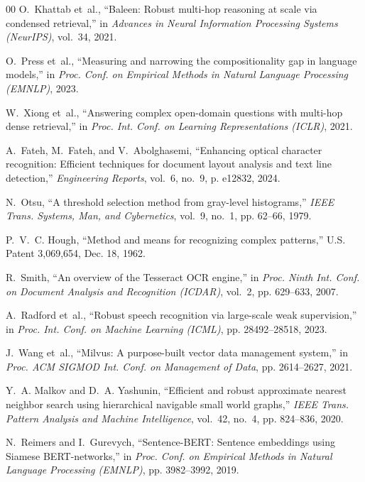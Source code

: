 \documentclass[conference]{IEEEtran}
\begin{document}
\begin{thebibliography}{00}
O.~Khattab et~al., ``Baleen: Robust multi-hop reasoning at scale via condensed retrieval,'' in \emph{Advances in Neural Information Processing Systems (NeurIPS)}, vol.~34, 2021.

O.~Press et~al., ``Measuring and narrowing the compositionality gap in language models,'' in \emph{Proc. Conf. on Empirical Methods in Natural Language Processing (EMNLP)}, 2023.

W.~Xiong et~al., ``Answering complex open-domain questions with multi-hop dense retrieval,'' in \emph{Proc. Int. Conf. on Learning Representations (ICLR)}, 2021.

A.~Fateh, M.~Fateh, and V.~Abolghasemi, ``Enhancing optical character recognition: Efficient techniques for document layout analysis and text line detection,'' \emph{Engineering Reports}, vol.~6, no.~9, p. e12832, 2024.

N.~Otsu, ``A threshold selection method from gray-level histograms,'' \emph{IEEE Trans. Systems, Man, and Cybernetics}, vol.~9, no.~1, pp. 62--66, 1979.

P.~V.~C. Hough, ``Method and means for recognizing complex patterns,'' U.S. Patent 3,069,654, Dec. 18, 1962.

R.~Smith, ``An overview of the Tesseract OCR engine,'' in \emph{Proc. Ninth Int. Conf. on Document Analysis and Recognition (ICDAR)}, vol.~2, pp. 629--633, 2007.

A.~Radford et~al., ``Robust speech recognition via large-scale weak supervision,'' in \emph{Proc. Int. Conf. on Machine Learning (ICML)}, pp. 28492--28518, 2023.

J.~Wang et~al., ``Milvus: A purpose-built vector data management system,'' in \emph{Proc. ACM SIGMOD Int. Conf. on Management of Data}, pp. 2614--2627, 2021.

Y.~A. Malkov and D.~A. Yashunin, ``Efficient and robust approximate nearest neighbor search using hierarchical navigable small world graphs,'' \emph{IEEE Trans. Pattern Analysis and Machine Intelligence}, vol.~42, no.~4, pp. 824--836, 2020.

N.~Reimers and I.~Gurevych, ``Sentence-BERT: Sentence embeddings using Siamese BERT-networks,'' in \emph{Proc. Conf. on Empirical Methods in Natural Language Processing (EMNLP)}, pp. 3982--3992, 2019.


\end{thebibliography}
\end{document}
